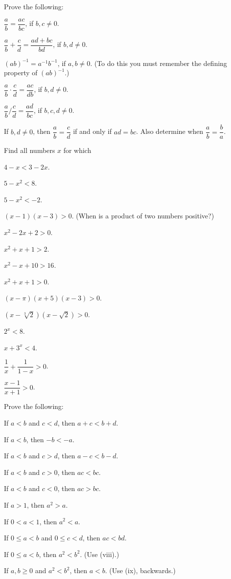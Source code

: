  Prove the following:
\begin{romans}
\item $\dfrac{a}{b} = \dfrac{ac}{bc}$, if $b, c \neq 0$.
\item $\dfrac{a}{b} + \dfrac{c}{d} = \dfrac{ad + bc}{bd}$, if $b, d \neq 0$.
\item $(ab)^{-1} = a^{-1}b^{-1}$, if $a, b \neq 0$. (To do this you must
  remember the defining property of $(ab)^{-1}$.)
\item $\dfrac{a}{b} \cdot \dfrac{c}{d} = \dfrac{ac}{db}$, if $b, d \neq 0$.
\item $\dfrac{a}{b} \bigg/ \dfrac{c}{d} = \dfrac{ad}{bc}$, if $b, c, d \neq 0$.
\item If $b, d \neq 0$, then $\dfrac{a}{b} = \dfrac{c}{d}$ if and only if
  $ad = bc$. Also determine when $\dfrac{a}{b} = \dfrac{b}{a}$.
\end{romans}

 Find all numbers $x$ for which
\begin{romans}
\item $4 - x < 3 - 2x$.
\item $5 - x^2 < 8$.
\item $5 - x^2 < -2$.
\item $(x-1)(x-3) > 0$. (When is a product of two numbers positive?)
\item $x^2 - 2x + 2 > 0$.
\item $x^2 + x + 1 > 2$.
\item $x^2 - x + 10 > 16$.
\item $x^2 + x + 1 > 0$.
\item $(x-\pi)(x+5)(x-3) > 0$.
\item $(x-\sqrt[3]{2})(x-\sqrt{2}) > 0$.
\item $2^x < 8$.
\item $x + 3^x < 4$.
\item $\dfrac{1}{x} + \dfrac{1}{1-x} > 0$.
\item $\dfrac{x-1}{x+1} > 0$.
\end{romans}

 Prove the following:
\begin{romans}
\item If $a < b$ and $c < d$, then $a + c < b + d$.
\item If $a < b$, then $-b < -a$.
\item If $a < b$ and $c > d$, then $a - c < b - d$.
\item If $a < b$ and $c > 0$, then $ac < bc$.
\item If $a < b$ and $c < 0$, then $ac > bc$.
\item If $a > 1$, then $a^2 > a$.
\item If $0 < a < 1$, then $a^2 < a$.
\item If $0 \leq a < b$ and $0 \leq c < d$, then $ac < bd$.
\item If $0 \leq a < b$, then $a^2 < b^2$. (Use (viii).)
\item If $a, b \geq 0$ and $a^2 < b^2$, then $a < b$. (Use (ix), backwards.)
\end{romans}

